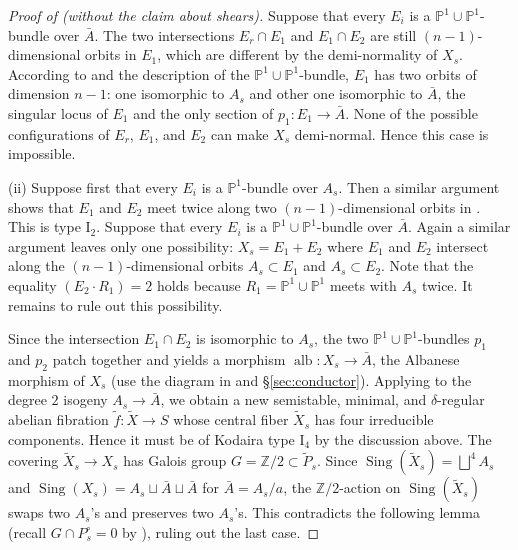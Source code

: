 \documentclass[reqno, letterpaper]{amsart}
\numberwithin{equation}{subsection}
\let\to\longrightarrow
\newcommand{\PP}{\mathbb{P}}
\newcommand{\ZZ}{\mathbb{Z}}
\DeclareMathOperator{\Sing}{Sing}
\DeclareMathOperator{\alb}{alb}
\begin{document}
\begin{proof}[Proof of  (without the claim about shears)]
			Suppose that every $E_i$ is a $\PP^1 \cup \PP^1$-bundle over $\bar A$. The two intersections $E_r \cap E_1$ and $E_1 \cap E_2$ are still $(n-1)$-dimensional orbits in $E_1$, which are different by the demi-normality of $X_s$. According to  and the description of the $\PP^1 \cup \PP^1$-bundle, $E_1$ has two orbits of dimension $n-1$: one isomorphic to $A_s$ and other one isomorphic to $\bar A$, the singular locus of $E_1$ and the only section of $p_1 : E_1 \to \bar A$. None of the possible configurations of $E_r$, $E_1$, and $E_2$ can make $X_s$ demi-normal. Hence this case is impossible.
			
			\medskip
			
			(ii) Suppose first that every $E_i$ is a $\PP^1$-bundle over $A_s$. Then a similar argument shows that $E_1$ and $E_2$ meet twice along two $(n-1)$-dimensional orbits in . This is type $\mathrm I_2$. Suppose that every $E_i$ is a $\PP^1 \cup \PP^1$-bundle over $\bar A$. Again a similar argument leaves only one possibility: $X_s = E_1 + E_2$ where $E_1$ and $E_2$ intersect along the $(n-1)$-dimensional orbits $A_s \subset E_1$ and $A_s \subset E_2$. Note that the equality $(E_2 \cdot R_1) = 2$ holds because $R_1 = \PP^1 \cup \PP^1$ meets with $A_s$ twice. It remains to rule out this possibility.
			
			\medskip
			
			Since the intersection $E_1 \cap E_2$ is isomorphic to $A_s$, the two $\PP^1 \cup \PP^1$-bundles $p_1$ and $p_2$ patch together and yields a morphism $\alb : X_s \to \bar A$, the Albanese morphism of $X_s$ (use the diagram in  and \S \ref{sec:conductor}). Applying  to the degree $2$ isogeny $A_s \to \bar A$, we obtain a new semistable, minimal, and $\delta$-regular abelian fibration $\tilde f : \tilde X \to S$ whose central fiber $\tilde X_s$ has four irreducible components. Hence it must be of Kodaira type $\mathrm I_4$ by the discussion above. The covering $\tilde X_s \to X_s$ has Galois group $G = \ZZ/2 \subset \tilde P_s$. Since $\Sing(\tilde X_s) = \bigsqcup^4 A_s$ and $\Sing(X_s) = A_s \sqcup \bar A \sqcup \bar A$ for $\bar A = A_s / a$, the $\ZZ/2$-action on $\Sing(\tilde X_s)$ swaps two $A_s$'s and preserves two $A_s$'s. This contradicts the following lemma (recall $G \cap P_s^\circ = 0$ by ), ruling out the last case.
		\end{proof}
		
\end{document}

